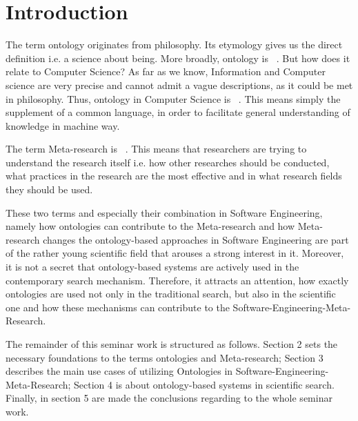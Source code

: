 
\section{Introduction}
\label{ch:Introduction}
The term ontology originates from philosophy. Its etymology gives us the direct definition i.e. a science about being. More broadly, ontology is \frqq\ \cite{OntPh}. But how does it relate to Computer Science? As far as we know, Information and Computer science are very precise and cannot admit a vague descriptions, as it could be met in philosophy. Thus, ontology in Computer Science is \frqq\ \cite{OntCS}. This means simply the supplement of a common language, in order to facilitate general understanding of knowledge in machine way. 

The term Meta-research is \frqq\ \cite{MR}. This means that researchers are trying to understand the research itself i.e. how other researches should be conducted, what practices in the research are the most effective and in what research fields they should be used. 

These two terms and especially their combination in Software Engineering, namely how ontologies can contribute to the Meta-research and how Meta-research changes the ontology-based approaches in Software Engineering are part of the rather young scientific field that arouses a strong interest in it. Moreover, it is not a secret that ontology-based systems are actively used in the contemporary search mechanism. Therefore, it attracts an attention, how exactly ontologies are used not only in the traditional search, but also in the scientific one and how these mechanisms can contribute to the Software-Engineering-Meta-Research.    


The remainder of this seminar work is structured as follows. Section 2 sets the necessary foundations to the terms ontologies and Meta-research; Section 3 describes the main use cases of utilizing Ontologies in Software-Engineering-Meta-Research; Section 4 is about ontology-based systems in scientific search. Finally, in section 5 are made the conclusions regarding to the whole seminar work.               